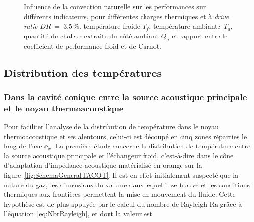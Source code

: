 \begin{figure}[!ht]
    \centering
	\begin{subfigure}[b]{.48\textwidth}
		\centering
        
		\caption{}
		\label{fig:PerfConvNat_Tf_DR35}
	\end{subfigure}		
	\begin{subfigure}[b]{.48\textwidth}
		\centering
        
		\caption{}
		\label{fig:PerfConvNat_Ta_DR35}
	\end{subfigure}
	\begin{subfigure}[b]{.48\textwidth}
		\centering
        
		\caption{}
		\label{fig:PerfConvNat_Qa_DR35}
	\end{subfigure}	
	\begin{subfigure}[b]{.48\textwidth}
		\centering
        
		\caption{}
		\label{fig:PerfConvNat_COP_DR35}
	\end{subfigure}	      
    \caption{Influence de la convection naturelle sur les performances sur différents indicateurs, pour différentes charges thermiques et à \textit{drive ratio} $DR~=~\qty{3.5}{\percent}$.  température froide $T_f$,  température ambiante~$T_a$,  quantité de chaleur extraite du côté ambiant $\dot Q_a$ et  rapport entre le coefficient de performance froid et de Carnot. }
    \label{fig:PerfConvNat_DR35}
\end{figure}

\subsection{Distribution des températures}
\subsubsection{Dans la cavité conique entre la source acoustique principale et le noyau thermoacoustique}

Pour faciliter l'analyse de la distribution de température dans le noyau thermoacoustique et ses alentours, celui-ci est découpé en cinq zones réparties le long de l'axe $\mathbf{e}_x$.
La première étude concerne la distribution de température entre la source acoustique principale et l'échangeur froid, c'est-à-dire dans le cône d'adaptation d'impédance acoustique matérialisé en orange sur la figure~\ref{fig:SchemaGeneralTACOT}. Il est en effet initialement suspecté que la nature du gaz, les dimensions du volume dans lequel il se trouve et les conditions thermiques aux frontières permettent la mise en mouvement du fluide. Cette hypothèse est de plus appuyée par le calcul du nombre de Rayleigh $\mathrm{Ra}$ grâce à l'équation~\eqref{eq:NbrRayleigh}, et dont la valeur est

